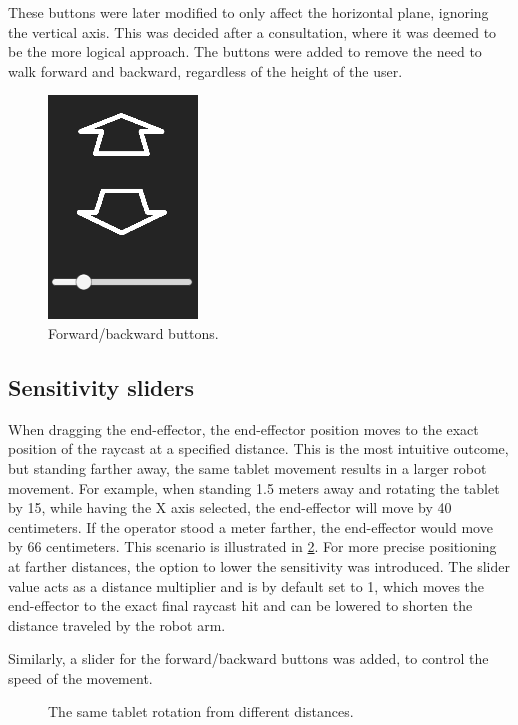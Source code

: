 These buttons were later modified to only affect the horizontal plane, ignoring the vertical axis. This was decided after a consultation, where it was deemed to be the more logical approach. The buttons were added to remove the need to walk forward and backward, regardless of the height of the user. 
\\
\begin{figure}[H]
    \centering
    \includegraphics{obrazky-figures/forwardbackwardbuttons.png}
    \caption{Forward/backward buttons.}
    \label{fig:forwardbackwardbuttons}
\end{figure}

\subsection{Sensitivity sliders}

When dragging the end-effector, the end-effector position moves to the exact position of the raycast at a specified distance. This is the most intuitive outcome, but standing farther away, the same tablet movement results in a larger robot movement. For example, when standing 1.5 meters away and rotating the tablet by 15\degree, while having the X axis selected, the end-effector will move by 40 centimeters. If the operator stood a meter farther, the end-effector would move by 66 centimeters. This scenario is illustrated in \ref{fig:closefar}. For more precise positioning at farther distances, the option to lower the sensitivity was introduced. The slider value acts as a distance multiplier and is by default set to 1, which moves the end-effector to the exact final raycast hit and can be lowered to shorten the distance traveled by the robot arm. 

Similarly, a slider for the forward/backward buttons was added, to control the speed of the movement. 

\begin{figure}
    \centering
    \subfloat{
        
        \label{close}
    }
    \qquad
    \subfloat{
        
        \label{far}
    }
    
    \caption{The same tablet rotation from different distances.}
    \label{fig:closefar}
\end{figure}


